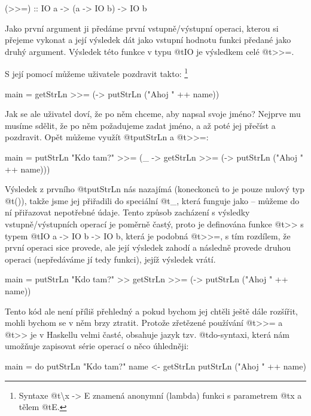 \begin{haskell}
(>>=) :: IO a -> (a -> IO b) -> IO b
\end{haskell}

Jako první argument ji předáme první vstupně/výstupní operaci, kterou si přejeme
vykonat a její výsledek dát jako vstupní hodnotu funkci předané jako druhý
argument. Výsledek této funkce  v typu @t{IO} je výsledkem celé
@t{>>=}.

S její pomocí můžeme uživatele pozdravit takto: \footnote{Syntaxe
@t{\textbackslash x -> E} znamená anonymní (lambda) funkci s parametrem @t{x} a
tělem @t{E}.}

\begin{haskell}
main = getStrLn >>= (\name -> putStrLn ("Ahoj " ++ name))
\end{haskell}
  
Jak se ale uživatel doví, že po něm chceme, aby napsal svoje jméno? Nejprve mu
musíme sdělit, že po něm požadujeme zadat jméno, a až poté jej přečíst a
pozdravit. Opět můžeme využít @t{putStrLn} a @t{>>=}:

\begin{haskell}
main = 
  putStrLn "Kdo tam?" >>= (\_ ->
    getStrLn >>= (\name ->
      putStrLn ("Ahoj " ++ name)))
\end{haskell}

Výsledek z prvního @t{putStrLn} nás nazajímá (koneckonců to je pouze nulový typ
@t{()}), takže jsme jej přiřadili do speciální  @t{_}, která
funguje jako  -- můžeme do ní přiřazovat nepotřebné údaje. Tento
způsob zacházení s výsledky vstupně/výstupních operací je poměrně častý, proto
je definována funkce @t{>>} s typem @t{IO a -> IO b -> IO b}, která je podobná
@t{>>=}, s tím rozdílem, že první operaci sice provede, ale její výsledek zahodí
a následně provede druhou operaci (nepředáváme jí tedy funkci), jejíž výsledek
vrátí.

\begin{haskell}
main = 
  putStrLn "Kdo tam?" >>
    getStrLn >>= (\name ->
      putStrLn ("Ahoj " ++ name))
\end{haskell}

Tento kód ale není příliš přehledný a pokud bychom jej chtěli ještě dále
rozšířit, mohli bychom se v něm brzy ztratit. Protože zřetězené používání
@t{>>=} a @t{>>} je v Haskellu velmi časté, obsahuje jazyk tzv. @t{do}-syntaxi,
která nám umožňuje zapisovat série operací o něco úhledněji:

\begin{haskell}
main = do
  putStrLn "Kdo tam?"
  name <- getStrLn
  putStrLn ("Ahoj " ++ name)
\end{haskell}
